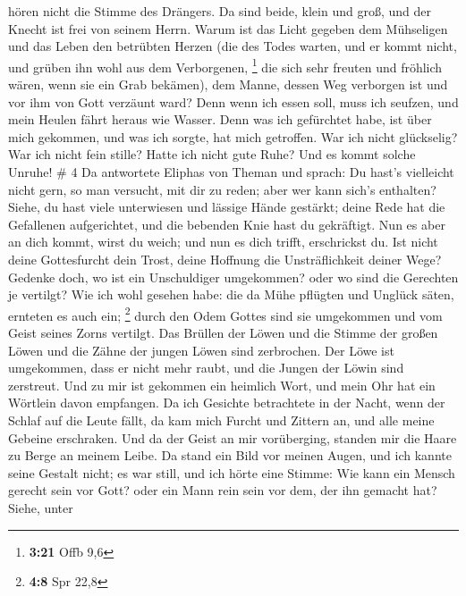 hören nicht die Stimme des Drängers.  Da sind beide,
klein und groß, und der Knecht ist frei von seinem Herrn.
 Warum ist das Licht gegeben dem Mühseligen und das Leben
den betrübten Herzen  (die des Todes warten, und er kommt
nicht, und grüben ihn wohl aus dem Verborgenen, \footnote{\textbf{3:21}
  Offb 9,6}  die sich sehr freuten und fröhlich wären,
wenn sie ein Grab bekämen),  dem Manne, dessen Weg
verborgen ist und vor ihm von Gott verzäunt ward?  Denn
wenn ich essen soll, muss ich seufzen, und mein Heulen fährt heraus wie
Wasser.  Denn was ich gefürchtet habe, ist über mich
gekommen, und was ich sorgte, hat mich getroffen.  War
ich nicht glückselig? War ich nicht fein stille? Hatte ich nicht gute
Ruhe? Und es kommt solche Unruhe! \# 4  Da antwortete
Eliphas von Theman und sprach:  Du hast's vielleicht nicht
gern, so man versucht, mit dir zu reden; aber wer kann sich's enthalten?
 Siehe, du hast viele unterwiesen und lässige Hände
gestärkt;  deine Rede hat die Gefallenen aufgerichtet, und
die bebenden Knie hast du gekräftigt.  Nun es aber an dich
kommt, wirst du weich; und nun es dich trifft, erschrickst du.
 Ist nicht deine Gottesfurcht dein Trost, deine Hoffnung
die Unsträflichkeit deiner Wege?  Gedenke doch, wo ist ein
Unschuldiger umgekommen? oder wo sind die Gerechten je vertilgt?
 Wie ich wohl gesehen habe: die da Mühe pflügten und
Unglück säten, ernteten es auch ein; \footnote{\textbf{4:8} Spr 22,8}
 durch den Odem Gottes sind sie umgekommen und vom Geist
seines Zorns vertilgt.  Das Brüllen der Löwen und die
Stimme der großen Löwen und die Zähne der jungen Löwen sind zerbrochen.
 Der Löwe ist umgekommen, dass er nicht mehr raubt, und
die Jungen der Löwin sind zerstreut.  Und zu mir ist
gekommen ein heimlich Wort, und mein Ohr hat ein Wörtlein davon
empfangen.  Da ich Gesichte betrachtete in der Nacht,
wenn der Schlaf auf die Leute fällt,  da kam mich Furcht
und Zittern an, und alle meine Gebeine erschraken.  Und
da der Geist an mir vorüberging, standen mir die Haare zu Berge an
meinem Leibe.  Da stand ein Bild vor meinen Augen, und
ich kannte seine Gestalt nicht; es war still, und ich hörte eine Stimme:
 Wie kann ein Mensch gerecht sein vor Gott? oder ein Mann
rein sein vor dem, der ihn gemacht hat?  Siehe, unter

